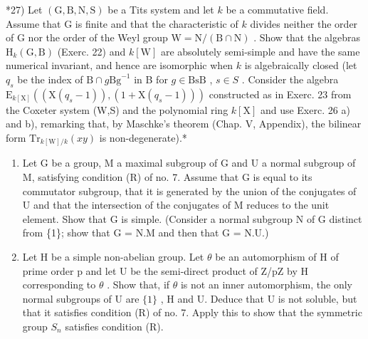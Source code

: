 *27) Let \((\mathrm{G},\mathrm{B},\mathrm{N},\mathrm{S})\) be a Tits system and let \(k\) be a commutative field. Assume that G is finite and that the characteristic of \(k\) divides neither the order of G nor the order of the Weyl group \(\mathrm{W} = \mathrm{N} / (\mathrm{B}\cap \mathrm{N})\) . Show that the algebras \(\mathrm{H}_k(\mathrm{G},\mathrm{B})\) (Exerc. 22) and \(k[\mathrm{W}]\) are absolutely semi-simple and have the same numerical invariant, and hence are isomorphic when \(k\) is algebraically closed (let \(q_{s}\) be the index of \(\mathrm{B}\cap g\mathrm{Bg}^{-1}\) in B for \(g\in \mathrm{BsB}\) , \(s\in S\) . Consider the algebra \(\mathrm{E}_{k[\mathrm{X}]}((\mathrm{X}(q_s - 1)),(1 + \mathrm{X}(q_s - 1)))\) constructed as in Exerc. 23 from the Coxeter system (W,S) and the polynomial ring \(k[\mathrm{X}]\) and use Exerc. 26 a) and b), remarking that, by Maschke's theorem (Chap. V, Appendix), the bilinear form \(\mathrm{Tr}_{k[\mathrm{W}] / k}(xy)\) is non-degenerate).*

\begin{enumerate}
\def\labelenumi{\arabic{enumi})}
\setcounter{enumi}{27}
\item
  Let G be a group, M a maximal subgroup of G and U a normal subgroup of M, satisfying condition (R) of no. 7. Assume that G is equal to its commutator subgroup, that it is generated by the union of the conjugates of U and that the intersection of the conjugates of M reduces to the unit element. Show that G is simple. (Consider a normal subgroup N of G distinct from \{1\}; show that G = N.M and then that G = N.U.)
\item
  Let H be a simple non-abelian group. Let \(\theta\) be an automorphism of H of prime order p and let U be the semi-direct product of Z/pZ by H corresponding to \(\theta\) . Show that, if \(\theta\) is not an inner automorphism, the only normal subgroups of U are \(\{1\}\) , H and U. Deduce that U is not soluble, but that it satisfies condition (R) of no. 7. Apply this to show that the symmetric group \(S_{n}\) satisfies condition (R).
\end{enumerate}

